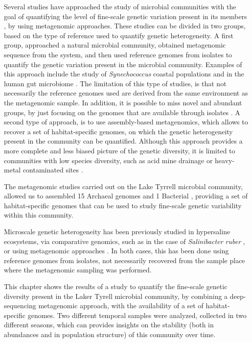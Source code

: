 Several studies have approached the study of microbial communities with the goal of quantifying the level of fine-scale genetic variation present in its members \cite{Wilmes:2009bn}, by using metagenomic approaches. These studies can be divided in two groups, based on the type of reference used to quantify genetic heterogeneity. A first group, approached a natural microbial community, obtained metagenomic sequence from the system, and then used reference genomes from isolates to quantify the genetic variation present in the microbial community. Examples of this approach include the study of \textit{Synechococcus} coastal populations \cite{Tai:2011jo} and in the human gut microbiome \cite{Schloissnig:2012hx}. The limitation of this type of studies, is that not necessarily the reference genomes used are derived from the same environment as the metagenomic sample. In addition, it is possible to miss novel and abundant groups, by just focusing on the genomes that are available through isolates \cite{Podell:2013kx,Herlemann:uy}. A second type of approach, is to use assembly-based metagenomics, which allows to recover a set of habitat-specific genomes, on which the genetic heterogeneity present in the community can be quantified. Although this approach provides a more complete and less biased picture of the genetic diversity, it is limited to communities with low species diversity, such as acid mine drainage \cite{Allen:2007ju} or heavy-metal contaminated sites \cite{Hemme:2010ds}.

The metagenomic studies carried out on the Lake Tyrrell microbial community, allowed us to assembled 15 Archaeal genomes and 1 Bacterial \cite{Narasingarao:2012kp,Podell:2013kx,Podell:2013fp}, providing a set of habitat-specific genomes that can be used to study fine-scale genetic variability within this community.

Microscale genetic heterogeneity has been previously studied in hypersaline ecosystems, via comparative genomics, such as in the case of \textit{Salinibacter ruber} \cite{PeNtildeA:2010ie}, or using metagenomic approaches \cite{Legault:2006kh,Pasic:2009bo,}. In both cases, this has been done using reference genomes from isolates, not necessarily recovered from the sample place where the metagenomic sampling was performed. 

This chapter shows the results of a study to quantify the fine-scale genetic diversity present in the Laker Tyrell microbial community, by combining a deep-sequencing metagenomic approach, with the availability of a set of habitat-specific genomes. Two different temporal samples were analyzed, collected in two different seasons, which can provides insights on the stability (both in abundances and in population structure) of this community over time.


